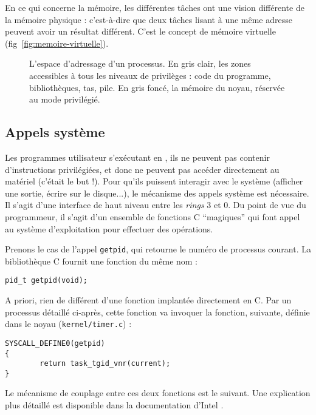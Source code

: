 En ce qui concerne la mémoire, les différentes tâches ont une vision différente
de la mémoire physique : c'est-à-dire que deux tâches lisant à une même adresse
peuvent avoir un résultat différent. C'est le concept de mémoire virtuelle
(fig~\ref{fig:memoire-virtuelle}).

\begin{figure}
\centering
\fbox{
  
}

\caption[Espace d'adressage d'un processus]{L'espace d'adressage d'un processus.
En gris clair, les zones accessibles à tous les niveaux de privilèges : code du
programme, bibliothèques, tas, pile. En gris foncé, la mémoire du noyau,
réservée au mode privilégié.}

\label{fig:memmap}
\end{figure}

\subsection{Appels système}

Les programmes utilisateur s'exécutant en , ils ne peuvent pas
contenir d'instructions privilégiées, et donc ne peuvent pas accéder directement
au matériel (c'était le but !). Pour qu'ils puissent interagir avec le système
(afficher une sortie, écrire sur le disque...), le mécanisme des appels système
est nécessaire. Il s'agit d'une interface de haut niveau entre les \emph{rings}
3 et 0. Du point de vue du programmeur, il s'agit d'un ensemble de fonctions C
``magiques'' qui font appel au système d'exploitation pour effectuer des
opérations.

Prenons le cas de l'appel \texttt{getpid}, qui retourne le numéro de processus
courant. La bibliothèque C fournit une fonction du même nom :

\begin{Verbatim}
pid_t getpid(void);
\end{Verbatim}

A priori, rien de différent d'une fonction implantée directement en C. Par un
processus détaillé ci-après, cette fonction va invoquer la fonction, suivante,
définie dans le noyau (\texttt{kernel/timer.c}) :

\begin{Verbatim}
SYSCALL_DEFINE0(getpid)
{
        return task_tgid_vnr(current);
}
\end{Verbatim}



Le mécanisme de couplage entre ces deux fonctions est le suivant. Une
explication plus détaillé est disponible dans la documentation d'Intel
\cite{intelsys}.

